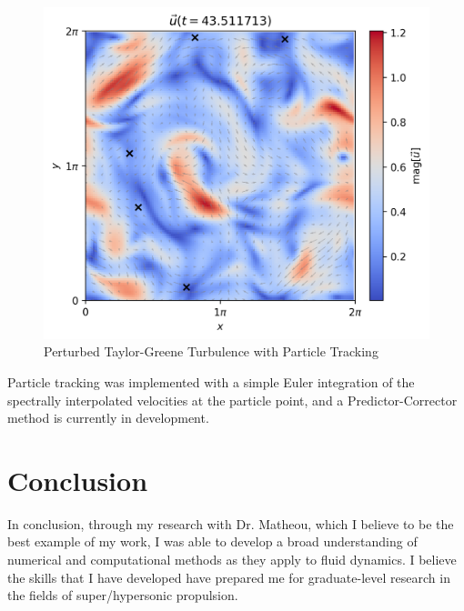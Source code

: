 \documentclass[10pt, reqno]{amsart}
\begin{document}
\begin{multicols}{2}
\vspace{-.1 in}
\begin{figure}[H]
    \centering
    \includegraphics[width=1\linewidth]{velocity field t = 43.51171.png}
    \caption{Perturbed Taylor-Greene Turbulence with Particle Tracking}
    \label{fig:2}
\end{figure}
\vspace{-.1 in}
Particle tracking was implemented with a simple Euler integration of the spectrally interpolated velocities at the particle point, and a Predictor-Corrector method is currently in development. 
\vspace{-.15 in}
\section{Conclusion}
In conclusion, through my research with Dr. Matheou, which I believe to be the best example of my work, I was able to develop a broad understanding of numerical and computational methods as they apply to fluid dynamics. 
I believe the skills that I have developed have prepared me for graduate-level research in the fields of super/hypersonic propulsion. 
\end{multicols}
\end{document}
